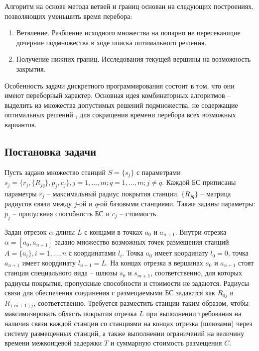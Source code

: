 Алгоритм на основе метода ветвей и границ основан на следующих построениях, позволяющих уменьшить время перебора:

\begin{enumerate}
  \item Ветвление. Разбиение исходного множества на попарно не пересекающие дочерние подмножества в ходе поиска оптимального решения.
  \item Получение нижних границ. Исследования текущей вершины на возможность закрытия.
\end{enumerate}

Особенность задачи дискретного программирования состоит в том, что они имеют переборный характер. Основная идея комбинаторных алгоритмов -- выделить из множества допустимых решений подмножества, не содержащие оптимальных решений \cite{SigalBook}, для сокращения времени перебора всех возможных вариантов. 




\subsection{Постановка задачи}

Пусть задано множество станций $S=\{s_j\}$ с параметрами $s_j=\{r_j,\{R_{jq} \},p_j, c_j \},j=1,...,m;q=1,...,m;j \neq q $. Каждой БС приписаны параметры $r_j$ -- максимальный радиус покрытия станции, $\{R_{jq} \}$ -- матрица радиусов связи между $j$-ой и $q$-ой базовыми станциями. Также заданы параметры: $p_j$ -- пропускная способность БС и $c_j$ -- стоимость.


Задан отрезок $\alpha$ длины $L$ с концами в точках $a_0$ и $a_{n+1}$. Внутри отрезка $\alpha = [a_0, a_{n+1}]$ задано множество возможных точек размещения станций $A=\{a_i \},i=1,...,n$ с координатами $l_i$. Точка $a_0$ имеет координату $l_0=0$, точка $a_{n+1}$ имеет координату $l_{n+1}=L$. На концах отрезка в вершинах $a_0$ и $a_{n+1}$ стоят станции специального вида -- шлюзы $s_0$ и $s_{m+1}$, соответственно, для которых радиусы покрытия, пропускные способности и стоимости не задаются. Радиусы связи для обеспечения соединения с размещаемыми БС задаются как $R_{0j}$ и $R_{(m+1)j}$, соответственно.
Требуется разместить станции таким образом, чтобы максимизировать область покрытия отрезка $L$ при выполнении требования на наличия связи каждой станции со станциями на концах отрезка (шлюзами) через систему размещенных станций, а также выполнении ограничений на величину времени межконцевой задержки $T$ и суммарную стоимость размещения $C$.


